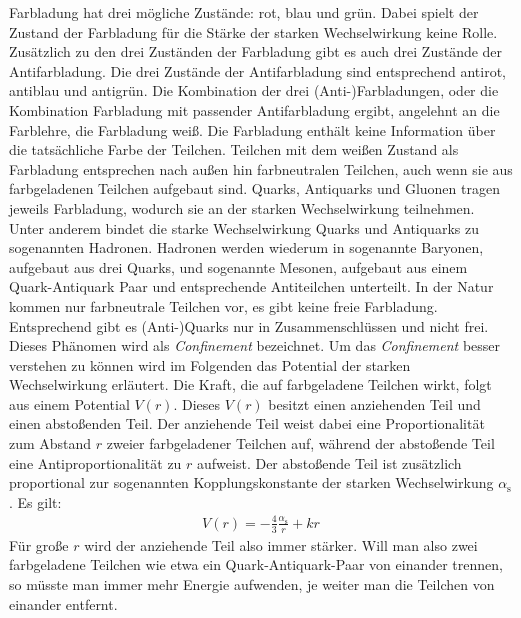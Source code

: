 Farbladung hat drei m\"ogliche Zust\"ande: rot, blau und gr\"un.
Dabei spielt der Zustand der Farbladung f\"ur die St\"arke der starken Wechselwirkung keine Rolle.
Zus\"atzlich zu den drei Zust\"anden der Farbladung gibt es auch drei Zust\"ande der Antifarbladung. 
Die drei Zust\"ande der Antifarbladung sind entsprechend antirot, antiblau und antigr\"un.
Die Kombination der drei (Anti-)Farbladungen, oder die Kombination Farbladung mit passender Antifarbladung ergibt, angelehnt an die Farblehre, die Farbladung wei{\ss}.
Die Farbladung enth\"alt keine Information \"uber die tats\"achliche Farbe der Teilchen.
Teilchen mit dem wei{\ss}en Zustand als Farbladung entsprechen nach au{\ss}en hin farbneutralen Teilchen, auch wenn sie aus farbgeladenen Teilchen aufgebaut sind.
\newline
Quarks, Antiquarks und Gluonen tragen jeweils Farbladung, wodurch sie an der starken Wechselwirkung teilnehmen.
Unter anderem bindet die starke Wechselwirkung Quarks und Antiquarks zu sogenannten Hadronen. %
Hadronen werden wiederum in sogenannte Baryonen, aufgebaut aus drei Quarks, und sogenannte Mesonen, aufgebaut aus einem Quark-Antiquark Paar und entsprechende Antiteilchen unterteilt.
In der Natur kommen nur farbneutrale Teilchen vor, es gibt keine freie Farbladung.
Entsprechend gibt es (Anti-)Quarks nur in Zusammenschl\"ussen und nicht frei. 
Dieses Ph\"anomen wird als \textit{Confinement} bezeichnet.
Um das \textit{Confinement} besser verstehen zu k\"onnen wird im Folgenden das Potential der starken Wechselwirkung erl\"autert.
\newline
Die Kraft, die auf farbgeladene Teilchen wirkt, folgt aus einem Potential $V(r)$.
Dieses $V(r)$ besitzt einen anziehenden Teil und einen abstoßenden Teil.
Der anziehende Teil weist dabei eine Proportionalit\"at zum Abstand $r$ zweier farbgeladener Teilchen auf, w\"ahrend der absto{\ss}ende Teil eine Antiproportionalit\"at zu $r$ aufweist.
Der absto{\ss}ende Teil ist zus\"atzlich proportional zur sogenannten Kopplungskonstante der starken Wechselwirkung $\alpha_\text{s}$.
Es gilt:
\begin{align} \label{eq:Potential}
V(r) = -\frac{4}{3}\frac{\alpha_\text{s}}{r} + kr 
\end{align}
F\"ur gro{\ss}e $r$ wird der anziehende Teil also immer stärker.
Will man also zwei farbgeladene Teilchen wie etwa ein Quark-Antiquark-Paar von einander trennen, so m\"usste man immer mehr Energie aufwenden, je weiter man die Teilchen von einander entfernt.
